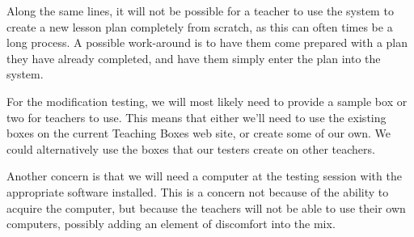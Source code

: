 \documentclass[12pt,titlepage]{article}
\begin{document}
Along the same lines, it will not be possible for a teacher to use the system to
create a new lesson plan completely from scratch, as this can often times be a
long process.  A possible work-around is to have them come prepared with a plan
they have already completed, and have them simply enter the plan into the system.

For the modification testing, we will most likely need to provide a sample box or
two for teachers to use.  This means that either we'll need to use the existing
boxes on the current Teaching Boxes web site, or create some of our own.  We could
alternatively use the boxes that our testers create on other teachers.

Another concern is that we will need a computer at the testing session with the
appropriate software installed.  This is a concern not because of the ability
to acquire the computer, but because the teachers will not be able to use their
own computers, possibly adding an element of discomfort into the mix.
\end{document}
